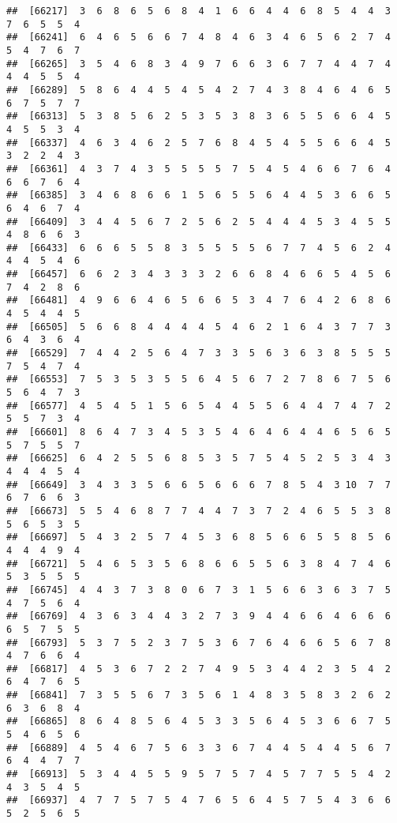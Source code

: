\documentclass[
]{book}
\begin{document}
\begin{verbatim}
##  [66217]  3  6  8  6  5  6  8  4  1  6  6  4  4  6  8  5  4  4  3  7  6  5  5  4
##  [66241]  6  4  6  5  6  6  7  4  8  4  6  3  4  6  5  6  2  7  4  5  4  7  6  7
##  [66265]  3  5  4  6  8  3  4  9  7  6  6  3  6  7  7  4  4  7  4  4  4  5  5  4
##  [66289]  5  8  6  4  4  5  4  5  4  2  7  4  3  8  4  6  4  6  5  6  7  5  7  7
##  [66313]  5  3  8  5  6  2  5  3  5  3  8  3  6  5  5  6  6  4  5  4  5  5  3  4
##  [66337]  4  6  3  4  6  2  5  7  6  8  4  5  4  5  5  6  6  4  5  3  2  2  4  3
##  [66361]  4  3  7  4  3  5  5  5  5  7  5  4  5  4  6  6  7  6  4  6  6  7  6  4
##  [66385]  3  4  6  8  6  6  1  5  6  5  5  6  4  4  5  3  6  6  5  6  4  6  7  4
##  [66409]  3  4  4  5  6  7  2  5  6  2  5  4  4  4  5  3  4  5  5  4  8  6  6  3
##  [66433]  6  6  6  5  5  8  3  5  5  5  5  6  7  7  4  5  6  2  4  4  4  5  4  6
##  [66457]  6  6  2  3  4  3  3  3  2  6  6  8  4  6  6  5  4  5  6  7  4  2  8  6
##  [66481]  4  9  6  6  4  6  5  6  6  5  3  4  7  6  4  2  6  8  6  4  5  4  4  5
##  [66505]  5  6  6  8  4  4  4  4  5  4  6  2  1  6  4  3  7  7  3  6  4  3  6  4
##  [66529]  7  4  4  2  5  6  4  7  3  3  5  6  3  6  3  8  5  5  5  7  5  4  7  4
##  [66553]  7  5  3  5  3  5  5  6  4  5  6  7  2  7  8  6  7  5  6  5  6  4  7  3
##  [66577]  4  5  4  5  1  5  6  5  4  4  5  5  6  4  4  7  4  7  2  5  5  7  3  4
##  [66601]  8  6  4  7  3  4  5  3  5  4  6  4  6  4  4  6  5  6  5  5  7  5  5  7
##  [66625]  6  4  2  5  5  6  8  5  3  5  7  5  4  5  2  5  3  4  3  4  4  4  5  4
##  [66649]  3  4  3  3  5  6  6  5  6  6  6  7  8  5  4  3 10  7  7  6  7  6  6  3
##  [66673]  5  5  4  6  8  7  7  4  4  7  3  7  2  4  6  5  5  3  8  5  6  5  3  5
##  [66697]  5  4  3  2  5  7  4  5  3  6  8  5  6  6  5  5  8  5  6  4  4  4  9  4
##  [66721]  5  4  6  5  3  5  6  8  6  6  5  5  6  3  8  4  7  4  6  5  3  5  5  5
##  [66745]  4  4  3  7  3  8  0  6  7  3  1  5  6  6  3  6  3  7  5  4  7  5  6  4
##  [66769]  4  3  6  3  4  4  3  2  7  3  9  4  4  6  6  4  6  6  6  6  5  7  5  5
##  [66793]  5  3  7  5  2  3  7  5  3  6  7  6  4  6  6  5  6  7  8  4  7  6  6  4
##  [66817]  4  5  3  6  7  2  2  7  4  9  5  3  4  4  2  3  5  4  2  6  4  7  6  5
##  [66841]  7  3  5  5  6  7  3  5  6  1  4  8  3  5  8  3  2  6  2  6  3  6  8  4
##  [66865]  8  6  4  8  5  6  4  5  3  3  5  6  4  5  3  6  6  7  5  5  4  6  5  6
##  [66889]  4  5  4  6  7  5  6  3  3  6  7  4  4  5  4  4  5  6  7  6  4  4  7  7
##  [66913]  5  3  4  4  5  5  9  5  7  5  7  4  5  7  7  5  5  4  2  4  3  5  4  5
##  [66937]  4  7  7  5  7  5  4  7  6  5  6  4  5  7  5  4  3  6  6  5  2  5  6  5

\end{verbatim}
\end{document}
